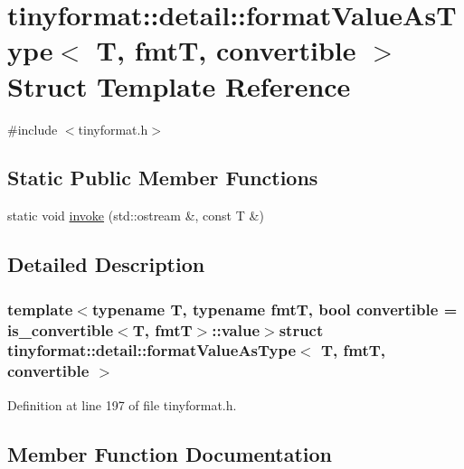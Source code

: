 \hypertarget{structtinyformat_1_1detail_1_1format_value_as_type}{}\section{tinyformat\+:\+:detail\+:\+:format\+Value\+As\+Type$<$ T, fmt\+T, convertible $>$ Struct Template Reference}
\label{structtinyformat_1_1detail_1_1format_value_as_type}


{\ttfamily \#include $<$tinyformat.\+h$>$}

\subsection*{Static Public Member Functions}
\begin{DoxyCompactItemize}
\item 
static void \hyperlink{structtinyformat_1_1detail_1_1format_value_as_type_a126bc5958024c456851f08fa380d1cac}{invoke} (std\+::ostream \&, const T \&)
\end{DoxyCompactItemize}


\subsection{Detailed Description}
\subsubsection*{template$<$typename T, typename fmt\+T, bool convertible = is\+\_\+convertible$<$\+T, fmt\+T$>$\+::value$>$struct tinyformat\+::detail\+::format\+Value\+As\+Type$<$ T, fmt\+T, convertible $>$}



Definition at line 197 of file tinyformat.\+h.



\subsection{Member Function Documentation}
\hypertarget{structtinyformat_1_1detail_1_1format_value_as_type_a126bc5958024c456851f08fa380d1cac}{}
